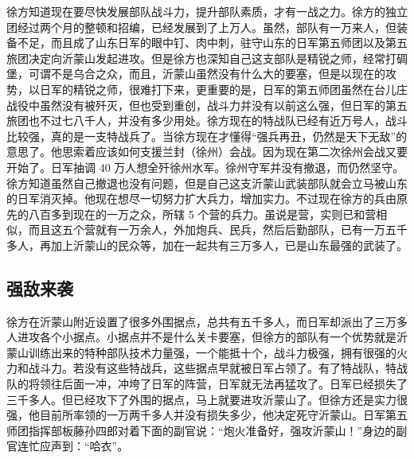\documentclass[UTF8,a4paper,titlepage,twoside,10.5pt]{article}
\begin{document}
徐方知道现在要尽快发展部队战斗力，提升部队素质，才有一战之力。徐方的独立团经过两个月的整顿和招编，已经发展到了上万人。虽然，部队有一万来人，但装备不足，而且成了山东日军的眼中钉、肉中刺，驻守山东的日军第五师团以及第五旅团决定向沂蒙山发起进攻。但是徐方也深知自己这支部队是精锐之师，经常打碉堡，可谓不是乌合之众，而且，沂蒙山虽然没有什么大的要塞，但是以现在的攻势，以日军的精锐之师，很难打下来，更重要的是，日军的第五师团虽然在台儿庄战役中虽然没有被歼灭，但也受到重创，战斗力并没有以前这么强，但日军的第五旅团也不过七八千人，并没有多少用处。徐方现在的特战队已经有近万号人，战斗比较强，真的是一支特战兵了。当徐方现在才懂得“强兵再丑，仍然是天下无敌”的意思了。他思索着应该如何支援兰封（徐州）会战。因为现在第二次徐州会战又要开始了。日军抽调 40 万人想全歼徐州水军。徐州守军并没有撤退，而仍然坚守。徐方知道虽然自己撤退也没有问题，但是自己这支沂蒙山武装部队就会立马被山东的日军消灭掉。他现在想尽一切努力扩大兵力，增加实力。不过现在徐方的兵由原先的八百多到现在的一万之众，所辖 5 个营的兵力。虽说是营，实则已和营相似，而且这五个营就有一万余人，外加炮兵、民兵，然后后勤部队，已有一万五千多人，再加上沂蒙山的民众等，加在一起共有三万多人，已是山东最强的武装了。

\subsection{强敌来袭}
\label{sec:orgec23a0d}
徐方在沂蒙山附近设置了很多外围据点，总共有五千多人，而日军却派出了三万多人进攻各个小据点。小据点并不是什么关卡要塞，但徐方的部队有一个优势就是沂蒙山训练出来的特种部队技术力量强，一个能抵十个，战斗力极强，拥有很强的火力和战斗力。若没有这些特战兵，这些据点早就被日军占领了。有了特战队，特战队的将领往后面一冲，冲垮了日军的阵营，日军就无法再猛攻了。日军已经损失了三千多人。但已经攻下了外围的据点，马上就要进攻沂蒙山了。但徐方还是实力很强，他目前所率领的一万两千多人并没有损失多少，他决定死守沂蒙山。日军第五师团指挥部板藤孙四郎对着下面的副官说：“炮火准备好，强攻沂蒙山！”身边的副官连忙应声到：“哈衣”。
\end{document}
